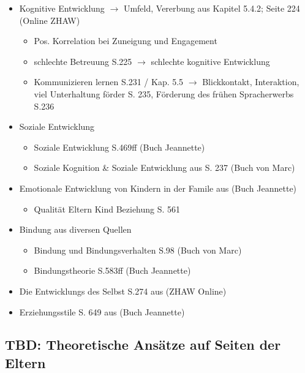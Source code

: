 \begin{itemize}
    \item Kognitive Entwicklung $\rightarrow$ Umfeld, Vererbung aus  Kapitel 5.4.2; Seite 224 (Online ZHAW)
    \begin{itemize}
        \item Pos. Korrelation bei Zuneigung und Engagement
        \item schlechte Betreuung S.225 $\rightarrow$ schlechte kognitive Entwicklung
        \item Kommunizieren lernen S.231 / Kap. 5.5 $\rightarrow$ Blickkontakt, Interaktion, viel Unterhaltung förder S. 235, Förderung des frühen Spracherwerbs S.236
    \end{itemize}
    \item Soziale Entwicklung
    \begin{itemize}
        \item Soziale Entwicklung S.469ff  (Buch Jeannette)
        \item Soziale Kognition \& Soziale Entwicklung aus  S. 237 (Buch von Marc)
    \end{itemize}
    \item Emotionale Entwicklung von Kindern in der Famile aus  (Buch Jeannette)
    \begin{itemize}
        \item Qualität Eltern Kind Beziehung S. 561
    \end{itemize}
    \item Bindung aus diversen Quellen
    \begin{itemize}
        \item Bindung und Bindungsverhalten S.98  (Buch von Marc)
        \item Bindungstheorie S.583ff  (Buch Jeannette)
    \end{itemize}
    \item Die Entwicklungs des Selbst S.274 aus  (ZHAW Online) 
    \item Erziehungsstile S. 649 aus  (Buch Jeannette)
\end{itemize}



\subsection{TBD: Theoretische Ansätze auf Seiten der Eltern} \label{sec:TheretischeAnsätze}

